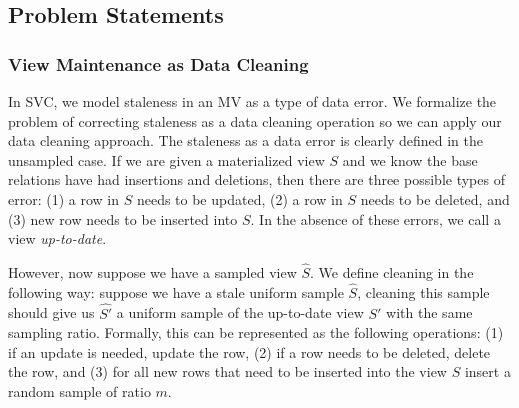 \subsection{Problem Statements}
\vspace{-.25em}
\subsubsection{View Maintenance as Data Cleaning}\label{cleaning}
In SVC, we model staleness in an MV as a type of data error.
We formalize the problem of correcting staleness as a data cleaning operation so we can apply our data cleaning approach.
The staleness as a data error is clearly defined in the unsampled case.
If we are given a materialized view $S$ and we know the base relations have had insertions and deletions, then there are three possible types of error:
(1) a row in $S$ needs to be updated, (2) a row in $S$ needs to be deleted, and (3) new row needs to be inserted into $S$.
In the absence of these errors, we call a view \emph{up-to-date}.

However, now suppose we have a sampled view $\hat{S}$.
We define cleaning in the following way: suppose we have a stale uniform sample $\hat{S}$, cleaning this sample
should give us $\hat{S'}$ a uniform sample of the up-to-date view $S'$ with the same sampling ratio.
Formally, this can be represented as the following operations: (1) if an update is needed, update the row, (2) if a row needs to be deleted, delete the row, and (3) for all new rows that need to be inserted into the view $S$ insert a random sample of ratio $m$.

